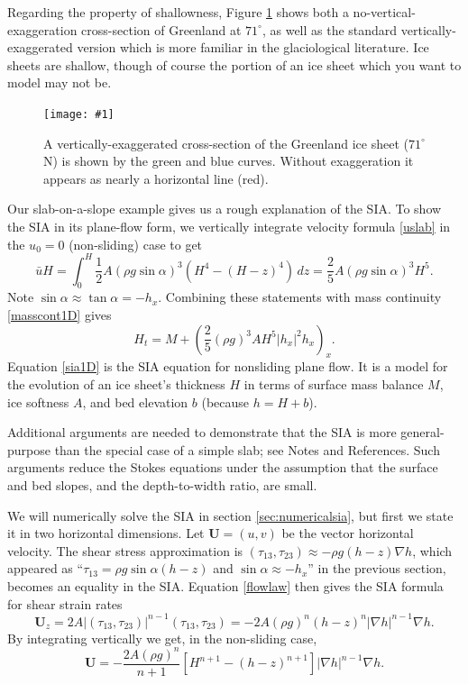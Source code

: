 \documentclass[letterpaper,final,12pt,reqno]{amsart}
\newcommand{\onefigsize}[3]{
\begin{figure}[ht]
\centering
\texttt{[image: \#1]}
\caption{#2}
\label{fig:#1}
\end{figure}}
\newcommand{\onefig}[2]{\onefigsize{#1}{#2}{3.0in}}
\begin{document}
Regarding the property of shallowness, Figure \ref{fig:green_transect} shows both a no-vertical-exaggeration cross-section of Greenland at $71^\circ$, as well as the standard vertically-exaggerated version which is more familiar in the glaciological literature.  Ice sheets are shallow, though of course the portion of an ice sheet which you want to model may not be.

\onefig{green_transect}{A vertically-exaggerated cross-section of the Greenland ice sheet ($71^\circ$ N) is shown by the green and blue curves.  Without exaggeration it appears as nearly a horizontal line (red).}

Our slab-on-a-slope example gives us a rough explanation of the SIA.  To show the SIA in its plane-flow form, we vertically integrate velocity formula \eqref{uslab} in the $u_0=0$ (non-sliding) case to get
\begin{equation}
\bar u H = \int_0^H \frac{1}{2} A (\rho g \sin\alpha)^3  \left(H^4 - (H-z)^4\right)\,dz = \frac{2}{5} A (\rho g \sin\alpha)^3 H^5. \label{siaubar}
\end{equation}
Note $\sin \alpha \approx \tan\alpha = - h_x$.  Combining these statements with mass continuity \eqref{masscont1D} gives
\begin{equation}
  H_t = M + \left(\frac{2}{5} (\rho g)^3 A H^5 |h_x|^2 h_x\right)_x. \label{sia1D}
\end{equation}
Equation \eqref{sia1D} is the SIA equation for nonsliding plane flow.  It is a model for the evolution of an ice sheet's thickness $H$ in terms of surface mass balance $M$, ice softness $A$, and bed elevation $b$ (because $h=H+b$).

Additional arguments are needed to demonstrate that the SIA is more general-purpose than the special case of a simple slab; see Notes and References.  Such arguments reduce the Stokes equations under the assumption that the surface and bed slopes, and the depth-to-width ratio, are small.

We will numerically solve the SIA in section \ref{sec:numericalsia}, but first we state it in two horizontal dimensions.  Let $\mathbf{U} = (u,v)$ be the vector horizontal velocity.  The shear stress approximation is $(\tau_{13},\tau_{23}) \approx - \rho g (h-z) \nabla h$, which appeared as ``$\tau_{13}= \rho g \sin \alpha (h-z)$ and $\sin \alpha \approx -h_x$'' in the previous section, becomes an equality in the SIA.  Equation \eqref{flowlaw} then gives the SIA formula for shear strain rates
\begin{equation*}
\mathbf{U}_z = 2 A |(\tau_{13},\tau_{23})|^{n-1} (\tau_{13},\tau_{23}) = - 2 A (\rho g)^n (h-z)^n |\nabla h|^{n-1} \nabla h.
\end{equation*}
By integrating vertically we get, in the non-sliding case,
\begin{equation}
\mathbf{U} = - \frac{2 A (\rho g)^n}{n+1} \left[H^{n+1} - (h-z)^{n+1}\right] |\nabla h|^{n-1} \nabla h.  \label{siavelocity}
\end{equation}
\end{document}
